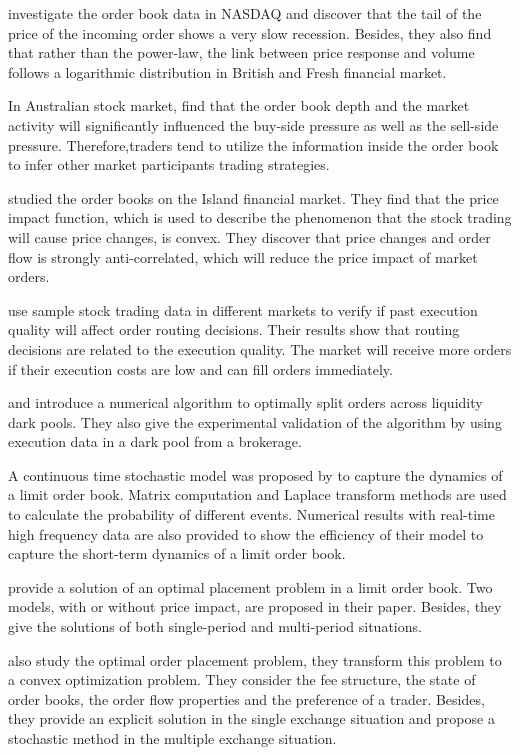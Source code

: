 \cite{potters2003more} investigate the order book data in NASDAQ and discover that the tail of the price of the incoming order shows a very slow recession. Besides, they also find that rather than the power-law, the link between price response and volume follows a logarithmic distribution in British and Fresh financial market.

In Australian stock market, \cite{hall2004continuous} find that the order book depth and the market activity will significantly influenced the buy-side pressure as well as the sell-side pressure. Therefore,traders tend to utilize the information inside the order book to infer other market participants trading strategies. 

\cite{weber2005order} studied the order books on the Island financial market. They find that the price impact function, which is used to describe the phenomenon that the stock trading will cause price changes, is convex. They discover that price changes and order flow is strongly anti-correlated, which will reduce the price impact of market orders. 

\cite{boehmer2007public} use sample stock trading data in different markets to verify if past execution quality will affect order routing decisions. Their results show that routing decisions are related to the execution quality. The market will receive more orders if their execution costs are low and can fill orders immediately. 

\cite{ganchev2010censored} and \cite{laruelle2011optimal} introduce a numerical algorithm to optimally split orders across liquidity dark pools. They also give the experimental validation of the algorithm by using execution data in a dark pool from a brokerage.

A continuous time stochastic model was proposed by \cite{cont2010stochastic} to capture the dynamics of a limit order book. Matrix computation and Laplace transform methods are used to calculate the probability of different events. Numerical results with real-time high frequency data are also provided to show the efficiency of their model to capture the short-term dynamics of a limit order book. 

\cite{guo2013optimal} provide a solution of an optimal placement problem in a limit order book. Two models, with or without price impact, are proposed in their paper. Besides, they give the solutions of both single-period and multi-period situations.   

\cite{cont2013optimal} also study the optimal order placement problem, they transform this problem to a convex optimization problem. They consider the fee structure, the state of order books, the order flow properties and the preference of a trader. Besides, they provide an explicit solution in the single exchange situation and propose a stochastic method in the multiple exchange situation. 


